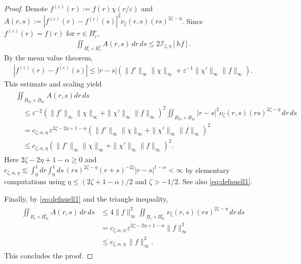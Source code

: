 \documentclass[12pt,reqno]{amsart}
\theoremstyle{definition}
\theoremstyle{remark}
\numberwithin{equation}{section}
\newcommand{\1}{\mathbbm{1}}
\renewcommand{\epsilon}{\varepsilon}
\def\ci{\mathcal{I}}
\begin{document}
\begin{proof}
  Denote $f^{(\epsilon)}(r):=f(r)\chi(r/\epsilon)$ and $A(r,s):=|f^{(\epsilon)}(r)-f^{(\epsilon)}(s)|^2\nu_\zeta(r,s)(rs)^{2\zeta-\eta}$. Since $f^{(\epsilon)}(r)=f(r)$ for $r\in B_\epsilon^c$,
  \begin{align}
    \iint_{B_\epsilon^c \times B_\epsilon^c} A(r,s)\,dr\,ds
    \leq 2\ci_{\zeta,\eta}[h f].
  \end{align}
  By the mean value theorem,
  \begin{align}
    |f^{(\epsilon)}(r)-f^{(\epsilon)}(s)|
    \leq |r-s| \left(\|f'\|_\infty \|\chi\|_\infty + \epsilon^{-1}\|\chi'\|_\infty\|f\|_\infty\right).
  \end{align}
  This estimate and scaling yield
  \begin{align}
    \label{e.BeBe}
    \begin{split}
      & \iint_{B_{2\epsilon}\times B_{2\epsilon}} A(r,s)dr\,ds \\
      & \quad \leq \epsilon^{-2} \left(\|f'\|_\infty \|\chi\|_\infty + \|\chi'\|_\infty\|f\|_\infty\right)^2 \iint_{B_{2\epsilon}\times B_{2\epsilon}} |r-s|^2\nu_\zeta(r,s)(rs)^{2\zeta-\eta}\,dr\,ds \\
      & \quad = c_{\zeta,\alpha,\eta}\, \epsilon^{2\zeta-2\eta+1-\alpha} \left(\|f'\|_\infty \|\chi\|_\infty + \|\chi'\|_\infty\|f\|_\infty\right)^2 \\
      & \quad \leq c_{\zeta,\alpha,\eta} \left(\|f'\|_\infty \|\chi\|_\infty + \|\chi'\|_\infty\|f\|_\infty\right)^2.
    \end{split}
  \end{align}
   Here $2\zeta-2\eta+1-\alpha\ge 0$ and $c_{\zeta,\alpha,\eta}\lesssim\int_0^1 dr \int_0^1 ds\, (rs)^{2\zeta-\eta}(r+s)^{-2\zeta}|r-s|^{1-\alpha}<\infty$ by elementary computations using $\eta\leq(2\zeta+1-\alpha)/2$ and $\zeta>-1/2$. See also \eqref{eq:defnuell1}.
   
  Finally, by \eqref{eq:defnuell1} and the triangle inequality,
  \begin{align}
    \label{e.BeBe2}
    \begin{split}
      \iint_{B_\epsilon\times B_{2\epsilon}^c} A(r,s)\,dr\,ds
      & \leq 4\|f\|_\infty^2 \iint_{B_\epsilon\times B_{2\epsilon}^c} \nu_\zeta(r,s) (rs)^{2\zeta-\eta}\,dr\,ds \\
      & = c_{\zeta,\alpha,\eta}\, \epsilon^{2\zeta-2\eta+1-\alpha} \|f\|_\infty^2 \\
      & \leq c_{\zeta,\alpha,\eta}\, \|f\|_\infty^2.
    \end{split}
  \end{align} 
  This concludes the proof.
\end{proof}
\end{document}
